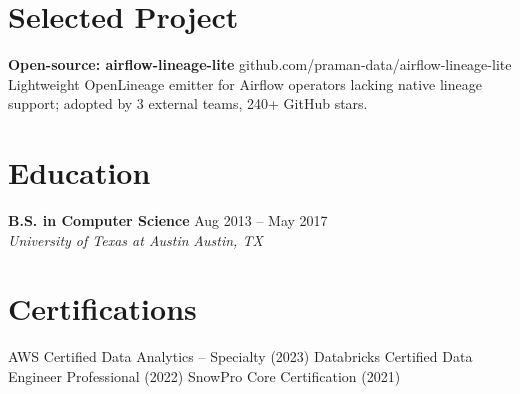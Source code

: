 \documentclass[10pt,letterpaper]{article}
\begin{document}
\section{Selected Project}
\textbf{Open-source: airflow-lineage-lite} \hfill {\small\color{slateGray}github.com/praman-data/airflow-lineage-lite}\\
{\small Lightweight OpenLineage emitter for Airflow operators lacking native lineage support;
adopted by 3 external teams, 240+ GitHub stars.}

\section{Education}
\textbf{B.S. in Computer Science} \hfill {\small\color{slateGray}Aug 2013 -- May 2017}\\
{\small\itshape\color{pipeTeal}University of Texas at Austin} \hfill {\small\itshape\color{slateGray}Austin, TX}

\section{Certifications}
{\small
AWS Certified Data Analytics -- Specialty (2023) \quad\textbar\quad
Databricks Certified Data Engineer Professional (2022) \quad\textbar\quad
SnowPro Core Certification (2021)
}
\end{document}
